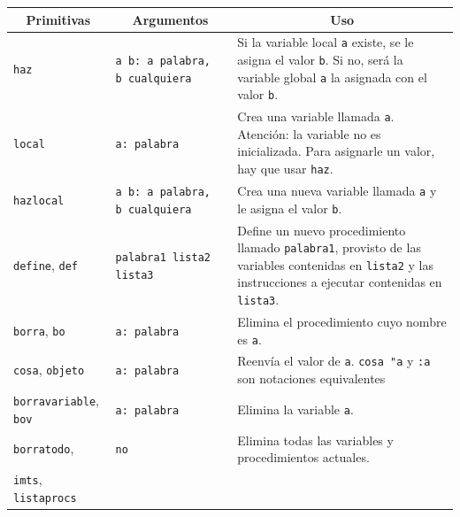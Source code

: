 \begin{center} \begin{longtable}{|m{3.5cm}|m{3cm}|m{8.5cm}|} \hline 
   \multicolumn{1}{|c|}{\textbf{Primitivas}} &
      \multicolumn{1}{c|}{\textbf{Argumentos}} &
         \multicolumn{1}{c|}{\textbf{Uso}} \\ \endhead \hline 
  \texttt{haz} \index{haz@\texttt{haz}} &
     \texttt{a~b:~a~palabra, b~cualquiera} &
        Si la variable local \texttt{a} existe, se le asigna el valor
        \texttt{b}. Si no, ser\'a la variable global \texttt{a} la
        asignada con el valor \texttt{b}. \\ \hline 
   \texttt{local} \index{local@\texttt{local}} &
     \texttt{a: palabra} & 
        Crea una variable llamada \texttt{a}. Atenci\'on: la variable no es
        inicializada. Para asignarle un valor, hay que usar \texttt{haz}.
                        \\ \hline 
   \texttt{hazlocal} \index{hazlocal@\texttt{hazlocal}} &
      \texttt{a~b:~a~palabra, b~cualquiera} &
        Crea una nueva variable llamada \texttt{a} y le asigna el valor
        \texttt{b}.\\ \hline 
   \texttt{define}, \index{define@\texttt{define}}
    \texttt{def} \index{def@\texttt{def}} & \texttt{palabra1 lista2 lista3} &
        Define un nuevo procedimiento llamado \texttt{palabra1}, provisto
        de las variables contenidas en \texttt{lista2} y las instrucciones
        a ejecutar contenidas en \texttt{lista3}. \\ \hline 
   \texttt{borra}, \index{borra@\texttt{borra}}
     \texttt{bo} \index{bo@\texttt{bo}} & \texttt{a: palabra} &
        Elimina el procedimiento cuyo nombre es \texttt{a}. \\ \hline 
   \texttt{cosa}, \index{cosa@\texttt{cosa}}
     \texttt{objeto} \index{objeto@\texttt{objeto}} & \texttt{a: palabra} &
        Reenv\'ia el valor de \texttt{a}.
        \verb+cosa "a+ y \texttt{:a} son notaciones equivalentes \\ \hline
   \texttt{borravariable}, \index{borravariable@\texttt{borravariable}}
     \texttt{bov} \index{bov@\texttt{bov}} & \texttt{a: palabra} &
        Elimina la variable \texttt{a}. \\ \hline 
   \texttt{borratodo}, \index{borratodo@\texttt{borratodo}} & \texttt{no} &
        Elimina todas las variables y procedimientos actuales. \\ \hline 
   \texttt{imts}, \index{imts@\texttt{imts}} 
     \texttt{listaprocs} \index{listaprocs@\texttt{listaprocs}} &

\end{longtable}
\end{center}
